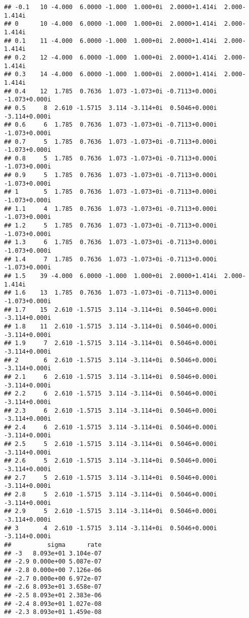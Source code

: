 \documentclass[
  12pt,
]{article}
\begin{document}
\begin{verbatim}
## -0.1   10 -4.000  6.0000 -1.000  1.000+0i  2.0000+1.414i  2.000-1.414i
## 0      10 -4.000  6.0000 -1.000  1.000+0i  2.0000+1.414i  2.000-1.414i
## 0.1    11 -4.000  6.0000 -1.000  1.000+0i  2.0000+1.414i  2.000-1.414i
## 0.2    12 -4.000  6.0000 -1.000  1.000+0i  2.0000+1.414i  2.000-1.414i
## 0.3    14 -4.000  6.0000 -1.000  1.000+0i  2.0000+1.414i  2.000-1.414i
## 0.4    12  1.785  0.7636  1.073 -1.073+0i -0.7113+0.000i -1.073+0.000i
## 0.5     8  2.610 -1.5715  3.114 -3.114+0i  0.5046+0.000i -3.114+0.000i
## 0.6     6  1.785  0.7636  1.073 -1.073+0i -0.7113+0.000i -1.073+0.000i
## 0.7     5  1.785  0.7636  1.073 -1.073+0i -0.7113+0.000i -1.073+0.000i
## 0.8     5  1.785  0.7636  1.073 -1.073+0i -0.7113+0.000i -1.073+0.000i
## 0.9     5  1.785  0.7636  1.073 -1.073+0i -0.7113+0.000i -1.073+0.000i
## 1       5  1.785  0.7636  1.073 -1.073+0i -0.7113+0.000i -1.073+0.000i
## 1.1     4  1.785  0.7636  1.073 -1.073+0i -0.7113+0.000i -1.073+0.000i
## 1.2     5  1.785  0.7636  1.073 -1.073+0i -0.7113+0.000i -1.073+0.000i
## 1.3     6  1.785  0.7636  1.073 -1.073+0i -0.7113+0.000i -1.073+0.000i
## 1.4     7  1.785  0.7636  1.073 -1.073+0i -0.7113+0.000i -1.073+0.000i
## 1.5    39 -4.000  6.0000 -1.000  1.000+0i  2.0000+1.414i  2.000-1.414i
## 1.6    13  1.785  0.7636  1.073 -1.073+0i -0.7113+0.000i -1.073+0.000i
## 1.7    15  2.610 -1.5715  3.114 -3.114+0i  0.5046+0.000i -3.114+0.000i
## 1.8    11  2.610 -1.5715  3.114 -3.114+0i  0.5046+0.000i -3.114+0.000i
## 1.9     7  2.610 -1.5715  3.114 -3.114+0i  0.5046+0.000i -3.114+0.000i
## 2       6  2.610 -1.5715  3.114 -3.114+0i  0.5046+0.000i -3.114+0.000i
## 2.1     6  2.610 -1.5715  3.114 -3.114+0i  0.5046+0.000i -3.114+0.000i
## 2.2     6  2.610 -1.5715  3.114 -3.114+0i  0.5046+0.000i -3.114+0.000i
## 2.3     6  2.610 -1.5715  3.114 -3.114+0i  0.5046+0.000i -3.114+0.000i
## 2.4     6  2.610 -1.5715  3.114 -3.114+0i  0.5046+0.000i -3.114+0.000i
## 2.5     5  2.610 -1.5715  3.114 -3.114+0i  0.5046+0.000i -3.114+0.000i
## 2.6     5  2.610 -1.5715  3.114 -3.114+0i  0.5046+0.000i -3.114+0.000i
## 2.7     5  2.610 -1.5715  3.114 -3.114+0i  0.5046+0.000i -3.114+0.000i
## 2.8     5  2.610 -1.5715  3.114 -3.114+0i  0.5046+0.000i -3.114+0.000i
## 2.9     5  2.610 -1.5715  3.114 -3.114+0i  0.5046+0.000i -3.114+0.000i
## 3       4  2.610 -1.5715  3.114 -3.114+0i  0.5046+0.000i -3.114+0.000i
##          sigma      rate
## -3   8.093e+01 3.104e-07
## -2.9 0.000e+00 5.087e-07
## -2.8 0.000e+00 7.126e-06
## -2.7 0.000e+00 6.972e-07
## -2.6 8.093e+01 3.658e-07
## -2.5 8.093e+01 2.383e-06
## -2.4 8.093e+01 1.027e-08
## -2.3 8.093e+01 1.459e-08

\end{verbatim}
\end{document}
